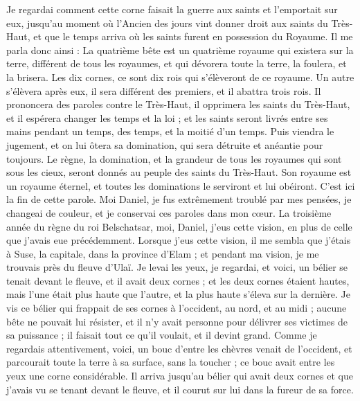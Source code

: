 \begin{multicols}{2}
Je regardai comment cette corne faisait la guerre aux saints et l’emportait sur eux,
jusqu'au moment où l'Ancien des jours vint donner droit aux saints du Très-Haut, et que le temps arriva où les saints furent en possession du Royaume.
Il me parla donc ainsi : La quatrième bête est un quatrième royaume qui existera sur la terre, différent de tous les royaumes, et qui dévorera toute la terre, la foulera, et la brisera.
Les dix cornes, ce sont dix rois qui s'élèveront de ce royaume. Un autre s'élèvera après eux, il sera différent des premiers, et il abattra trois rois.
Il prononcera des paroles contre le Très-Haut, il opprimera les saints du Très-Haut, et il espérera changer les temps et la loi ; et les saints seront livrés entre ses mains pendant un temps, des temps, et la moitié d’un temps.
Puis viendra le jugement, et on lui ôtera sa domination, qui sera détruite et anéantie pour toujours.
Le règne, la domination, et la grandeur de tous les royaumes qui sont sous les cieux, seront donnés au peuple des saints du Très-Haut. Son royaume est un royaume éternel, et toutes les dominations le serviront et lui obéiront.
C’est ici la fin de cette parole. Moi Daniel, je fus extrêmement troublé par mes pensées, je changeai de couleur, et je conservai ces paroles dans mon cœur.
\VerseOne{}La troisième année du règne du roi Belschatsar, moi, Daniel, j’eus cette vision, en plus de celle que j’avais eue précédemment.
Lorsque j’eus cette vision, il me sembla que j’étais à Suse, la capitale, dans la province d'Elam ; et pendant ma vision, je me trouvais près du fleuve d’Ulaï.
Je levai les yeux, je regardai, et voici, un bélier se tenait devant le fleuve, et il avait deux cornes ; et les deux cornes étaient hautes, mais l'une était plus haute que l'autre, et la plus haute s'éleva sur la dernière.
Je vis ce bélier qui frappait de ses cornes à l'occident, au nord, et au midi ; aucune bête ne pouvait lui résister, et il n'y avait personne pour délivrer ses victimes de sa puissance ; il faisait tout ce qu’il voulait, et il devint grand.
Comme je regardais attentivement, voici, un bouc d'entre les chèvres venait de l'occident, et parcourait toute la terre à sa surface, sans la toucher ; ce bouc avait entre les yeux une corne considérable.
Il arriva jusqu'au bélier qui avait deux cornes et que j'avais vu se tenant devant le fleuve, et il courut sur lui dans la fureur de sa force.

\end{multicols}
